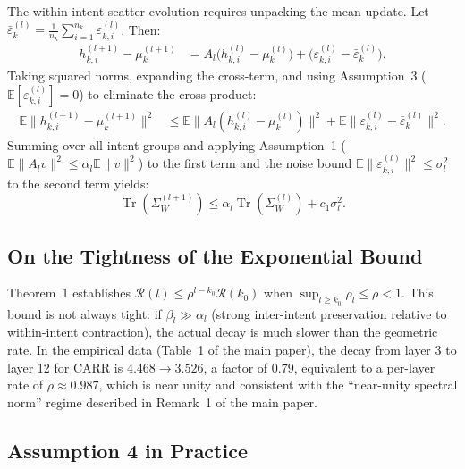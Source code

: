 \documentclass[letterpaper,10pt]{article}
\newcommand{\tr}{\operatorname{Tr}}
\begin{document}
The within-intent scatter evolution requires unpacking the mean update. Let $\bar{\varepsilon}_k^{(l)} = \frac{1}{n_k}\sum_{i=1}^{n_k}\varepsilon_{k,i}^{(l)}$. Then:
\begin{align}
h_{k,i}^{(l+1)} - \mu_k^{(l+1)}
&= A_l \bigl(h_{k,i}^{(l)} - \mu_k^{(l)}\bigr) + \bigl(\varepsilon_{k,i}^{(l)} - \bar{\varepsilon}_k^{(l)}\bigr).
\end{align}
Taking squared norms, expanding the cross-term, and using Assumption~3 ($\mathbb{E}[\varepsilon_{k,i}^{(l)}] = 0$) to eliminate the cross product:
\begin{align}
\mathbb{E}\bigl\|h_{k,i}^{(l+1)} - \mu_k^{(l+1)}\bigr\|^2
&\le \mathbb{E}\bigl\|A_l(h_{k,i}^{(l)} - \mu_k^{(l)})\bigr\|^2 + \mathbb{E}\bigl\|\varepsilon_{k,i}^{(l)} - \bar{\varepsilon}_k^{(l)}\bigr\|^2.
\end{align}
Summing over all intent groups and applying Assumption~1 ($\mathbb{E}\|A_l v\|^2 \le \alpha_l \mathbb{E}\|v\|^2$) to the first term and the noise bound $\mathbb{E}\|\varepsilon_{k,i}^{(l)}\|^2 \le \sigma_l^2$ to the second term yields:
\begin{equation}
\tr(\Sigma_W^{(l+1)}) \le \alpha_l \tr(\Sigma_W^{(l)}) + c_1 \sigma_l^2.
\end{equation}

\subsection{On the Tightness of the Exponential Bound}

Theorem~1 establishes $\mathcal{R}(l) \le \rho^{l-k_0} \mathcal{R}(k_0)$ when $\sup_{l \ge k_0}\rho_l \le \rho < 1$. This bound is not always tight: if $\beta_l \gg \alpha_l$ (strong inter-intent preservation relative to within-intent contraction), the actual decay is much slower than the geometric rate. In the empirical data (Table~1 of the main paper), the decay from layer 3 to layer 12 for CARR is $4.468 \to 3.526$, a factor of $0.79$, equivalent to a per-layer rate of $\rho \approx 0.987$, which is near unity and consistent with the ``near-unity spectral norm'' regime described in Remark~1 of the main paper.

\subsection{Assumption 4 in Practice}
\end{document}
